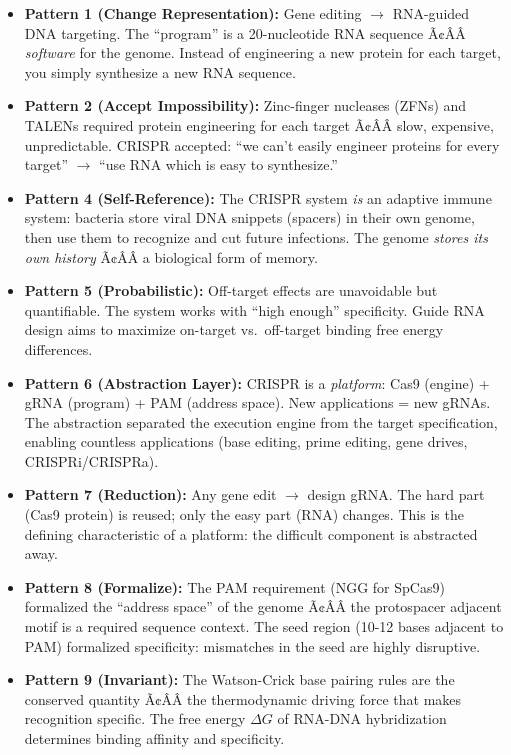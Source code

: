 \begin{itemize}
\item \textbf{Pattern 1 (Change Representation):} Gene editing $\to$ RNA-guided DNA targeting. The ``program'' is a 20-nucleotide RNA sequence Ã¢ÂÂ \emph{software} for the genome. Instead of engineering a new protein for each target, you simply synthesize a new RNA sequence.

\item \textbf{Pattern 2 (Accept Impossibility):} Zinc-finger nucleases (ZFNs) and TALENs required protein engineering for each target Ã¢ÂÂ slow, expensive, unpredictable. CRISPR accepted: ``we can't easily engineer proteins for every target'' $\to$ ``use RNA which is easy to synthesize.''

\item \textbf{Pattern 4 (Self-Reference):} The CRISPR system \emph{is} an adaptive immune system: bacteria store viral DNA snippets (spacers) in their own genome, then use them to recognize and cut future infections. The genome \emph{stores its own history} Ã¢ÂÂ a biological form of memory.

\item \textbf{Pattern 5 (Probabilistic):} Off-target effects are unavoidable but quantifiable. The system works with ``high enough'' specificity. Guide RNA design aims to maximize on-target vs.\ off-target binding free energy differences.

\item \textbf{Pattern 6 (Abstraction Layer):} CRISPR is a \emph{platform}: Cas9 (engine) + gRNA (program) + PAM (address space). New applications = new gRNAs. The abstraction separated the execution engine from the target specification, enabling countless applications (base editing, prime editing, gene drives, CRISPRi/CRISPRa).

\item \textbf{Pattern 7 (Reduction):} Any gene edit $\to$ design gRNA. The hard part (Cas9 protein) is reused; only the easy part (RNA) changes. This is the defining characteristic of a platform: the difficult component is abstracted away.

\item \textbf{Pattern 8 (Formalize):} The PAM requirement (NGG for SpCas9) formalized the ``address space'' of the genome Ã¢ÂÂ the protospacer adjacent motif is a required sequence context. The seed region (10-12 bases adjacent to PAM) formalized specificity: mismatches in the seed are highly disruptive.

\item \textbf{Pattern 9 (Invariant):} The Watson-Crick base pairing rules are the conserved quantity Ã¢ÂÂ the thermodynamic driving force that makes recognition specific. The free energy $\Delta G$ of RNA-DNA hybridization determines binding affinity and specificity.
\end{itemize}

